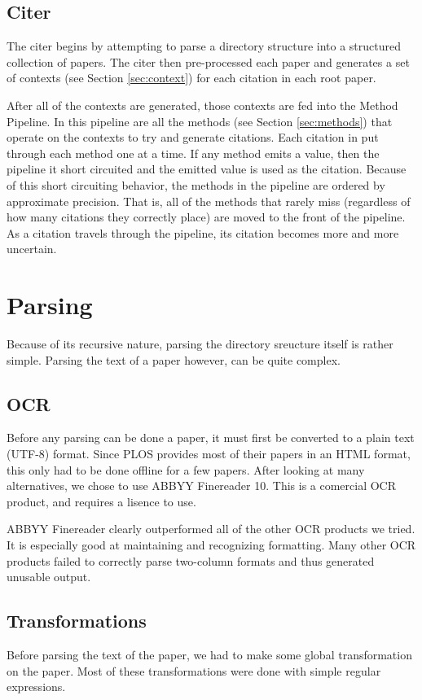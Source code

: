 \documentclass[10pt, conference, compsocconf]{IEEEtran}
\begin{document}
\subsection{Citer}\label{sec:archCiter}
The citer begins by attempting to parse a directory structure into a structured collection of papers.
The citer then pre-processed each paper and generates a set of contexts (see Section \ref{sec:context}) for each citation in each
root paper.

After all of the contexts are generated, those contexts are fed into the Method Pipeline. In this pipeline are all the methods (see Section \ref{sec:methods})
that operate on the contexts to try and generate citations. Each citation in put through each method one at a time. If any method emits a value, then the pipeline
it short circuited and the emitted value is used as the citation. Because of this short circuiting behavior, the methods in the pipeline are ordered by approximate
precision. That is, all of the methods that rarely miss (regardless of how many citations they correctly place) are moved to the front of the pipeline.
As a citation travels through the pipeline, its citation becomes more and more uncertain.

\section{Parsing}\label{sec:parsing}
Because of its recursive nature, parsing the directory sreucture itself is rather simple.
Parsing the text of a paper however, can be quite complex.

\subsection{OCR}
Before any parsing can be done a paper, it must first be converted to a plain text (UTF-8) format.
Since PLOS provides most of their papers in an HTML format, this only had to be done offline for a few
papers. After looking at many alternatives, we chose to use ABBYY Finereader 10\cite{abbyy}. This
is a comercial OCR product, and requires a lisence to use.

ABBYY Finereader clearly outperformed all of the other OCR products we tried. It is especially
good at maintaining and recognizing formatting. Many other OCR products failed to correctly parse
two-column formats and thus generated unusable output.

\subsection{Transformations}
Before parsing the text of the paper, we had to make some global transformation on the paper.
Most of these transformations were done with simple regular expressions.
\end{document}
